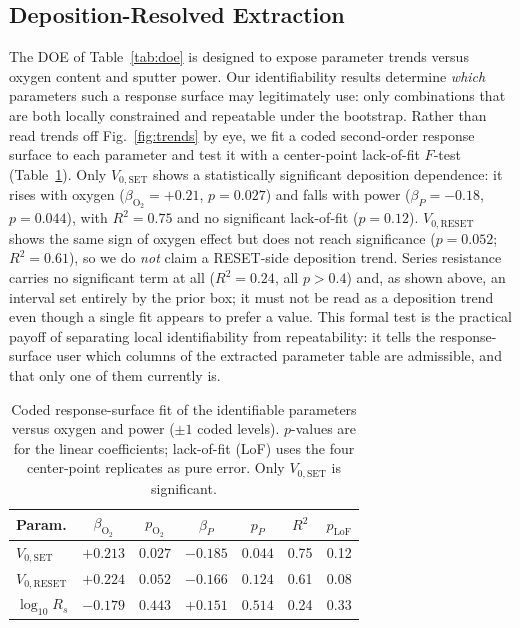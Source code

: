 \documentclass[journal]{IEEEtran}
\begin{document}
\subsection{Deposition-Resolved Extraction}
\label{sec:res-trends}

The DOE of Table~\ref{tab:doe} is designed to expose parameter trends versus
oxygen content and sputter power.  Our identifiability results determine
\emph{which} parameters such a response surface may legitimately use: only
combinations that are both locally constrained and repeatable under the
bootstrap.  Rather than read trends off Fig.~\ref{fig:trends} by eye, we fit a
coded second-order response surface to each parameter and test it with a
center-point lack-of-fit $F$-test (Table~\ref{tab:doe-rsm}).  Only
$V_{0,\mathrm{SET}}$ shows a statistically significant deposition dependence:
it rises with oxygen ($\beta_{\mathrm{O}_2}=+0.21$, $p=0.027$) and falls with
power ($\beta_{P}=-0.18$, $p=0.044$), with $R^2=0.75$ and no significant
lack-of-fit ($p=0.12$).  $V_{0,\mathrm{RESET}}$ shows the same sign of oxygen
effect but does not reach significance ($p=0.052$; $R^2=0.61$), so we do
\emph{not} claim a RESET-side deposition trend.  Series resistance carries no
significant term at all ($R^2=0.24$, all $p>0.4$) and, as shown above, an
interval set entirely by the prior box; it must not be read as a deposition
trend even though a single fit appears to prefer a value.  This formal test is
the practical payoff of separating local identifiability from repeatability: it
tells the response-surface user which columns of the extracted parameter table
are admissible, and that only one of them currently is.

\begin{table}[!t]
\centering
\caption{Coded response-surface fit of the identifiable parameters versus
oxygen and power ($\pm1$ coded levels).  $p$-values are for the linear
coefficients; lack-of-fit (LoF) uses the four center-point replicates as pure
error.  Only $V_{0,\mathrm{SET}}$ is significant.}
\label{tab:doe-rsm}
\footnotesize
\begin{tabular}{@{}lcccccc@{}}
\toprule
Param. & $\beta_{\mathrm{O}_2}$ & $p_{\mathrm{O}_2}$ & $\beta_{P}$ & $p_{P}$ &
$R^2$ & $p_{\mathrm{LoF}}$\\
\midrule
$V_{0,\mathrm{SET}}$  & $+0.213$ & $0.027$ & $-0.185$ & $0.044$ & 0.75 & 0.12\\
$V_{0,\mathrm{RESET}}$ & $+0.224$ & $0.052$ & $-0.166$ & $0.124$ & 0.61 & 0.08\\
$\log_{10}R_s$ & $-0.179$ & $0.443$ & $+0.151$ & $0.514$ & 0.24 & 0.33\\
\bottomrule
\end{tabular}
\end{table}
\end{document}
